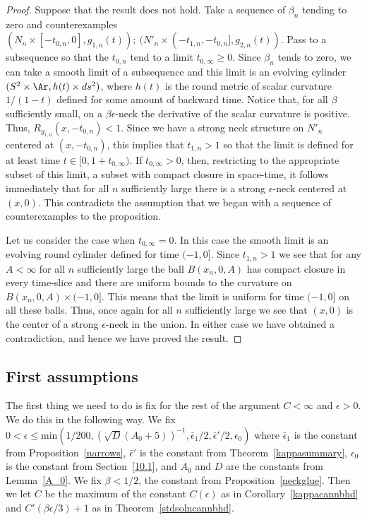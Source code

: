 \begin{proof}
Suppose that the result does not hold. Take a sequence of $\beta_n$
tending to zero and counterexamples $(N_n\times
[-t_{0,n},0],g_{1,n}(t));\ (N'_n\times
(-t_{1,n},-t_{0,n}],g_{2,n}(t))$. Pass to a subsequence so that the
$t_{0,n}$ tend to a limit $t_{0,\infty}\ge 0$. Since $\beta_n$ tends
to zero, we can take a smooth limit of a subsequence and this limit
is an evolving cylinder $(S^2\times \Ar, h(t)\times ds^2)$, where
$h(t)$ is the round metric of scalar curvature $1/(1-t)$ defined for
some amount of backward time. Notice that, for all $\beta$
sufficiently small, on a $\beta\epsilon$-neck the derivative of the
scalar curvature is positive. Thus, $R_{g_{1,n}}(x,-t_{0,n})<1$.
Since we have a strong neck structure on $N'_n$ centered at
$(x,-t_{0,n})$, this implies that $t_{1,n}>1$ so that the limit is
defined for at least time $t\in [0, 1+t_{0,\infty})$. If
$t_{0,\infty}>0$, then, restricting to the appropriate subset of
this limit, a subset with compact closure in space-time, it follows
immediately that for all $n$ sufficiently large there is a strong
$\epsilon$-neck centered at $(x,0)$. This contradicts the assumption
that we began with a sequence of counterexamples to the
proposition.

Let us consider the case when $t_{0,\infty}=0$. In this case the
smooth limit is an evolving round cylinder defined for time
$(-1,0]$.
 Since $t_{1,n}>1$ we
see that for any $A<\infty$ for all $n$ sufficiently large the ball
$B(x_n,0,A)$ has compact closure in every time-slice and there are
uniform bounds to the curvature on $B(x_n,0,A)\times (-1,0]$. This
means that the limit is uniform for time $(-1,0]$ on all these
balls. Thus, once again for all $n$ sufficiently large we see that
$(x,0)$ is the center of a strong $\epsilon$-neck in the union. In
either case we have obtained a contradiction, and hence we have
proved the result. 
\end{proof}








\subsection{First assumptions}\label{firstassumpt}

 The first thing we need
to do is fix for the rest of the argument $C<\infty$ and
$\epsilon>0$. We do this in the following way. We fix $0<\epsilon\le
\mathrm{min}(1/200,\left(\sqrt{D}(A_0+5)\right)^{-1},\bar\epsilon_1/2,\bar
\epsilon'/2,\epsilon_0)$ where  $\bar\epsilon_1$ is the constant from
Proposition~\ref{narrows}, $\bar\epsilon'$ is the constant from
Theorem~\ref{kappasummary}, $\epsilon_0$ is the constant from Section~\ref{10.1},
and $A_0$ and $D$ are the constants from
Lemma~\ref{A_0}.
 We fix $\beta<1/2$, the constant from
Proposition~\ref{neckglue}.  Then we let $C$ be the maximum of the
constant $C(\epsilon)$ as in Corollary~\ref{kappacannbhd} and
$C'(\beta\epsilon/3)+1$ as in Theorem~\ref{stdsolncannbhd}.


